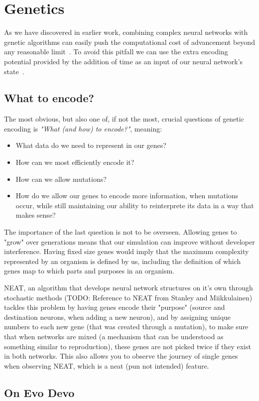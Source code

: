 \section{Genetics}

As we have discovered in earlier work, combining complex neural networks 
with genetic algorithms can easily push the computational cost of advancement
beyond any reasonable limit~\cite{Ferner2017}.
To avoid this pitfall we can use the extra encoding potential provided by 
the addition of time as an input of our neural network's state~\cite{Paugam-Moisy2012}.

\subsection{What to encode?}

The most obvious, but also one of, if not the most, crucial questions of genetic encoding is \emph{"What (and how) to encode?"}, meaning:

\begin{itemize}
	\item What data do we need to represent in our genes?
	\item How can we most efficiently encode it?
	\item How can we allow mutations?
	\item How do we allow our genes to encode more information, when mutations occur, while still maintaining our ability to reinterprete its data in a way that makes sense?
\end{itemize}

The importance of the last question is not to be overseen. Allowing genes to "grow" over generations means that our simulation can improve without developer interference. Having fixed size genes would imply that the maximum complexity represented by an organism is defined by us, including the definition of which genes map to which parts and purposes in an organism.

NEAT, an algorithm that develops neural network structures on it's own through stochastic methods (TODO: Reference to NEAT from Stanley and Miikkulainen) tackles this problem by having genes encode their "purpose" (source and destination neurons, when adding a new neuron), and by assigning unique numbers to each new gene (that was created through a mutation), to make sure that when networks are mixed (a mechanism that can be understood as something similar to reproduction), these genes are not picked twice if they exist in both networks. This also allows you to observe the journey of single genes when observing NEAT, which is a neat (pun not intended) feature.


\subsection{On Evo Devo}
